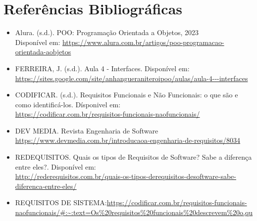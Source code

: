 \documentclass[
	12pt,				%
	openright,			%
	twoside,			%
	a4paper,			%
	english,			%
	brazil				%
	]{abntex2}
\begin{document}
\chapter{Referências Bibliográficas}

\begin{itemize}
    \item Alura. (s.d.). POO: Programação Orientada a Objetos, 2023 \\
	Disponível em: \url{https://www.alura.com.br/artigos/poo-programacao-orientada-aobjetos}
    \item FERREIRA, J. (s.d.). Aula 4 - Interfaces. Disponível em:\\
	\url{https://sites.google.com/site/anhangueraniteroipoo/aulas/aula-4---interfaces}
    \item CODIFICAR. (s.d.). Requisitos Funcionais e Não Funcionais: o que são e como
	identificá-los. Dísponivel em:\\ \url{https://codificar.com.br/requisitos-funcionais-naofuncionais/}
	\item DEV MEDIA. Revista Engenharia de Software
	\url{https://www.devmedia.com.br/introducaoa-engenharia-de-requisitos/8034}
	\item REDEQUISITOS. Quais os tipos de Requisitos de Software? Sabe a diferença
	entre eles?. Disponível em:\\
	\url{http://rederequisitos.com.br/quais-os-tipos-derequisitos-desoftware-sabe-diferenca-entre-eles/}
	\item REQUISITOS DE SISTEMA:\url{https://codificar.com.br/requisitos-funcionais-naofuncionais/#:~:text=Os%20requisitos%20funcionais%20descrevem%20o,qu}
\end{itemize}

\printindex
\end{document}
